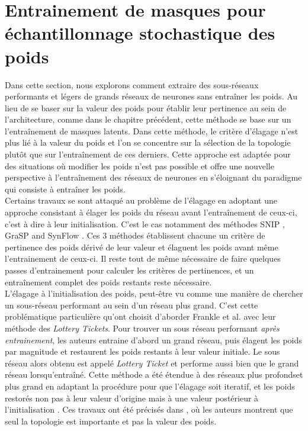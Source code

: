 \section*{Entrainement de masques pour échantillonnage stochastique des poids}

Dans cette section, nous explorons comment extraire des sous-réseaux performants
et légers de grands réseaux de neurones sans entraîner les poids. Au lieu de se
baser sur la valeur des poids pour établir leur pertinence au sein de
l'architecture, comme dans le chapitre précédent, cette méthode se base sur un
l'entraînement de masques latents. Dans cette méthode, le critère d'élagage
n'est plus lié à la valeur du poids et l'on se concentre sur la sélection de la
topologie plutôt que sur l'entraînement de ces derniers. Cette approche est
adaptée pour des situations où modifier les poids n'est pas possible et offre
une nouvelle perspective à l'entraînement des réseaux de neurones en s'éloignant
du paradigme qui consiste à entraîner les poids.\\

Certains travaux se sont attaqué au problème de l'élagage en adoptant une
approche consistant à élager les poids du réseau avant l'entraînement de
ceux-ci, c'est à dire à leur initialisation. C'est le cas notamment des méthodes
SNIP \cite{DBLP:conf/iclr/LeeAT19}, GraSP \cite{DBLP:conf/iclr/WangZG20} and
SynFlow \cite{DBLP:conf/nips/TanakaKYG20}. Ces 3 méthodes établissent chacune un
critère de pertinence des poids dérivé de leur valeur et élaguent les poids
avant même l'entrainement de ceux-ci. Il reste tout de même nécessaire de faire
quelques passes d'entrainement pour calculer les critères de pertinences, et un
entraînement complet des poids restants reste nécessaire.\\

L'élagage à l'initialisation des poids, peut-être vu comme une manière de
chercher un sous-réseau performant au sein d'un réseau plus grand. C'est cette
problématique particulière qu'ont choisit d'aborder Frankle et al.
\cite{DBLP:conf/iclr/FrankleC19} avec leur méthode des \emph{Lottery Tickets}.
Pour trouver un sous réseau performant \emph{après entrainement}, les auteurs
entraine d'abord un grand réseau, puis élagent les poids par magnitude et
restaurent les poids restants à leur valeur initiale. Le sous réseau alors
obtenu est appelé \emph{Lottery Ticket} et performe aussi bien que le grand
réseau lorsqu'entraîné. Cette méthode a été étendue à des réseaux plus
profondset plus grand en adaptant la procédure pour que  l'élagage soit
iteratif, et les poids restorés non pas à leur valeur d'origine mais à une
valeur postérieur à l'initialisation \cite{DBLP:conf/icml/FrankleD0C20}. Ces
travaux ont été précisés dans \cite{DBLP:conf/iclr/LiuSZHD19}, où les auteurs
montrent que seul la topologie est importante et pas la valeur des poids.\\





